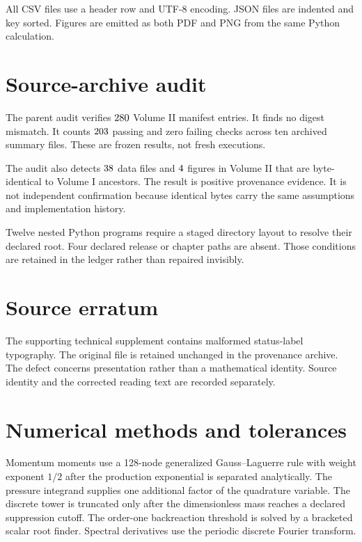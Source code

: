 All CSV files use a header row and UTF-8 encoding.  JSON files are indented and key sorted.  Figures are emitted as both PDF and PNG from the same Python calculation.

\section{Source-archive audit}

The parent audit verifies \(280\) Volume II manifest entries.  It finds no digest mismatch.  It counts \(203\) passing and zero failing checks across ten archived summary files.  These are frozen results, not fresh executions.

The audit also detects \(38\) data files and \(4\) figures in Volume II that are byte-identical to Volume I ancestors.  The result is positive provenance evidence.  It is not independent confirmation because identical bytes carry the same assumptions and implementation history.

Twelve nested Python programs require a staged directory layout to resolve their declared root.  Four declared release or chapter paths are absent.  Those conditions are retained in the ledger rather than repaired invisibly.

\section{Source erratum}
The supporting technical supplement contains malformed status-label typography. The original file is retained unchanged in the provenance archive. The defect concerns presentation rather than a mathematical identity. Source identity and the corrected reading text are recorded separately.

\clearpage
\section{Numerical methods and tolerances}

Momentum moments use a 128-node generalized Gauss--Laguerre rule with weight exponent $1/2$ after the production exponential is separated analytically.  The pressure integrand supplies one additional factor of the quadrature variable.  The discrete tower is truncated only after the dimensionless mass reaches a declared suppression cutoff.  The order-one backreaction threshold is solved by a bracketed scalar root finder.  Spectral derivatives use the periodic discrete Fourier transform.

